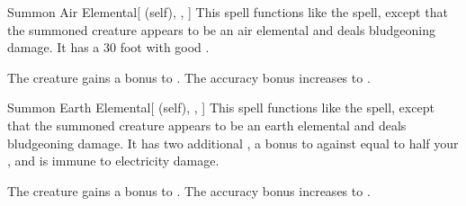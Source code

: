 \lowercase{\hypertarget{spell:Summon Air Elemental}{}}\label{spell:Summon Air Elemental}
\begin{attuneability}[Rank 4]{\hypertarget{spell:Summon Air Elemental}{Summon Air Elemental}}[ (self), , ]
This spell functions like the  spell, except that the summoned creature appears to be an air elemental and deals bludgeoning damage.
It has a 30 foot  with good .

\rankline
{} The creature gains a  bonus to .
 The accuracy bonus increases to .
\end{attuneability}
\vspace{0.25em}



\lowercase{\hypertarget{spell:Summon Earth Elemental}{}}\label{spell:Summon Earth Elemental}
\begin{attuneability}[Rank 4]{\hypertarget{spell:Summon Earth Elemental}{Summon Earth Elemental}}[ (self), , ]
This spell functions like the  spell, except that the summoned creature appears to be an earth elemental and deals bludgeoning damage.
It has two additional , a bonus to  against  equal to half your , and is immune to electricity damage.

\rankline
{} The creature gains a  bonus to .
 The accuracy bonus increases to .
\end{attuneability}
\vspace{0.25em}



